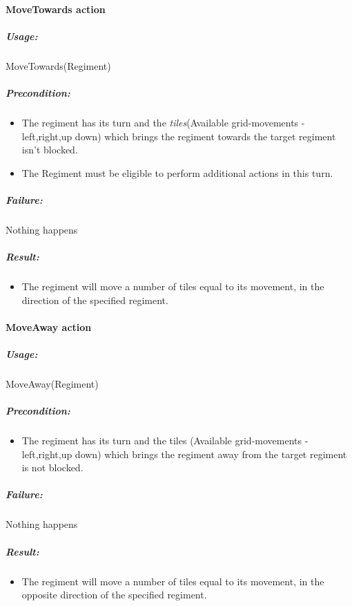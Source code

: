 		\paragraph{MoveTowards action}
		\subparagraph{Usage:} 
		MoveTowards(Regiment) \\
		
		\subparagraph{Precondition:} 
		\begin{itemize}\itemsep0.0001cm
			\item The regiment has its turn and the \textit{tiles}(Available grid-movements - left,right,up down) 
		which brings the regiment towards the target regiment isn't blocked.\\
			\item The Regiment must be eligible to perform additional actions in this turn.\\
		\end{itemize}
		
		\subparagraph{Failure:} 
		Nothing happens \\
		
		\subparagraph{Result:}
		\begin{itemize}\itemsep0.0001cm
		\item The regiment will move a number of tiles equal to its movement, in the direction of the specified regiment.
		\end{itemize}
		
		\paragraph{MoveAway action}
		\subparagraph{Usage:} 
		MoveAway(Regiment) \\
		
		\subparagraph{Precondition:} 
		\begin{itemize}\itemsep0.0001cm
		\item The regiment has its turn and the tiles (Available grid-movements - left,right,up down)
		which brings the regiment away from the target regiment is not blocked.
		\end{itemize}
		
		\subparagraph{Failure:} 
		Nothing happens \\
		
		\subparagraph{Result:}
		\begin{itemize}\itemsep0.0001cm
			\item The regiment will move a number of tiles equal to its movement, in the opposite direction of the specified regiment.
		\end{itemize}
				
